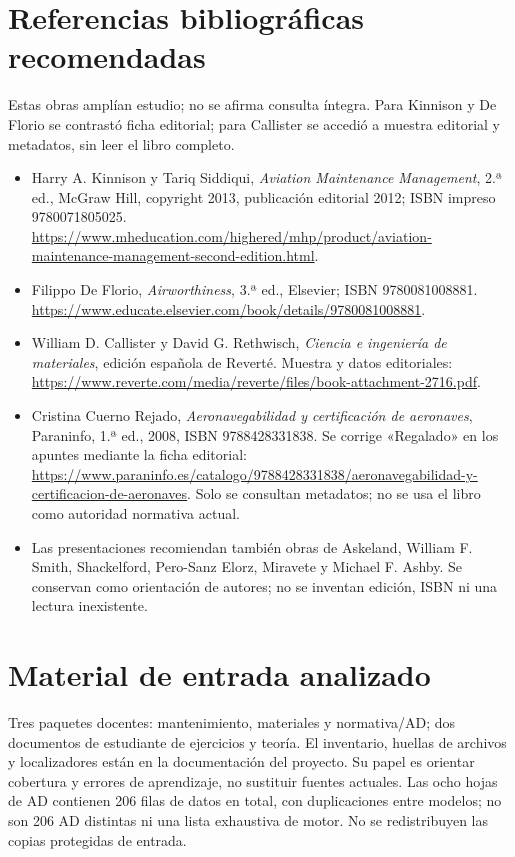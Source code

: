 \section*{Referencias bibliográficas recomendadas}
Estas obras amplían estudio; no se afirma consulta íntegra. Para Kinnison y De Florio se contrastó ficha editorial; para Callister se accedió a muestra editorial y metadatos, sin leer el libro completo.
\begin{itemize}
\item Harry A. Kinnison y Tariq Siddiqui, \textit{Aviation Maintenance Management}, 2.ª ed., McGraw Hill, copyright 2013, publicación editorial 2012; ISBN impreso 9780071805025. \url{https://www.mheducation.com/highered/mhp/product/aviation-maintenance-management-second-edition.html}.
\item Filippo De Florio, \textit{Airworthiness}, 3.ª ed., Elsevier; ISBN 9780081008881. \url{https://www.educate.elsevier.com/book/details/9780081008881}.
\item William D. Callister y David G. Rethwisch, \textit{Ciencia e ingeniería de materiales}, edición española de Reverté. Muestra y datos editoriales: \url{https://www.reverte.com/media/reverte/files/book-attachment-2716.pdf}.
\item Cristina Cuerno Rejado, \textit{Aeronavegabilidad y certificación de aeronaves}, Paraninfo, 1.ª ed., 2008, ISBN 9788428331838. Se corrige «Regalado» en los apuntes mediante la ficha editorial: \url{https://www.paraninfo.es/catalogo/9788428331838/aeronavegabilidad-y-certificacion-de-aeronaves}. Solo se consultan metadatos; no se usa el libro como autoridad normativa actual.
\item Las presentaciones recomiendan también obras de Askeland, William F. Smith, Shackelford, Pero-Sanz Elorz, Miravete y Michael F. Ashby. Se conservan como orientación de autores; no se inventan edición, ISBN ni una lectura inexistente.
\end{itemize}
\section*{Material de entrada analizado}
Tres paquetes docentes: mantenimiento, materiales y normativa/AD; dos documentos de estudiante de ejercicios y teoría. El inventario, huellas de archivos y localizadores están en la documentación del proyecto. Su papel es orientar cobertura y errores de aprendizaje, no sustituir fuentes actuales. Las ocho hojas de AD contienen 206 filas de datos en total, con duplicaciones entre modelos; no son 206 AD distintas ni una lista exhaustiva de motor. No se redistribuyen las copias protegidas de entrada.

